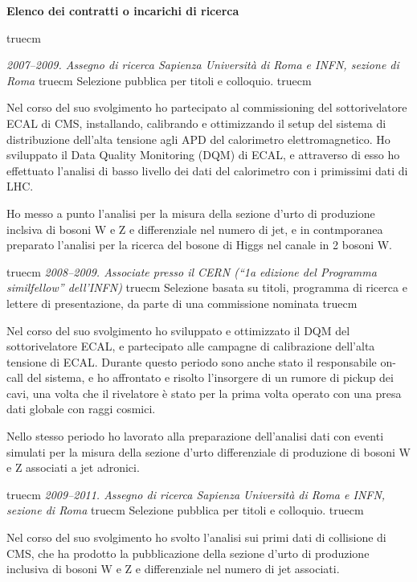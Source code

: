 \documentclass[11pt,twoside,a4paper]{article}
\begin{document}
\begin{center}
\textbf{Elenco dei contratti o incarichi di ricerca}
\end{center}
 truecm

\textit{2007--2009. Assegno di ricerca Sapienza Universit\`a di Roma e INFN, sezione di Roma}
 truecm
Selezione pubblica per titoli e colloquio.
 truecm

Nel corso del suo svolgimento ho partecipato al commissioning del
sottorivelatore ECAL di CMS, installando, calibrando e ottimizzando il
setup del sistema di distribuzione dell'alta tensione agli APD del
calorimetro elettromagnetico. Ho sviluppato il Data Quality Monitoring
(DQM) di ECAL, e attraverso di esso ho effettuato l'analisi di basso
livello dei dati del calorimetro con i primissimi dati di LHC.

Ho messo a punto l'analisi per la misura della sezione d'urto di
produzione inclsiva di bosoni W e Z e differenziale nel numero di jet,
e in contmporanea preparato l'analisi per la ricerca del bosone di
Higgs nel canale in 2 bosoni W.

 truecm
\textit{2008--2009. Associate presso il CERN (``1a edizione del Programma similfellow'' dell'INFN)}
 truecm
Selezione basata su titoli, programma di ricerca e
lettere di presentazione, da parte di una commissione nominata
 truecm

Nel corso del suo svolgimento ho sviluppato e ottimizzato il DQM del
sottorivelatore ECAL, e partecipato alle campagne di calibrazione
dell'alta tensione di ECAL. Durante questo periodo sono anche stato il
responsabile on-call del sistema, e ho affrontato e risolto
l'insorgere di un rumore di pickup dei cavi, una volta che il
rivelatore \`e stato per la prima volta operato con una presa dati
globale con raggi cosmici.

Nello stesso periodo ho lavorato alla preparazione dell'analisi dati
con eventi simulati per la misura della sezione d'urto differenziale
di produzione di bosoni W e Z associati a jet adronici.


 truecm
\textit{2009--2011. Assegno di ricerca Sapienza Universit\`a di Roma e INFN, sezione di Roma}
 truecm
Selezione pubblica per titoli e colloquio.
 truecm

Nel corso del suo svolgimento ho svolto l'analisi sui primi dati di
collisione di CMS, che ha prodotto la pubblicazione della sezione
d'urto di produzione inclusiva di bosoni W e Z e differenziale nel
numero di jet associati.
\end{document}
